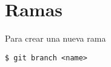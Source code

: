 \documentclass[letterpaper,12pt]{article}
\begin{document}
\section*{Ramas}
Para crear una nueva rama
\begin{verbatim}
$ git branch <name>
\end{verbatim}
\end{document}
